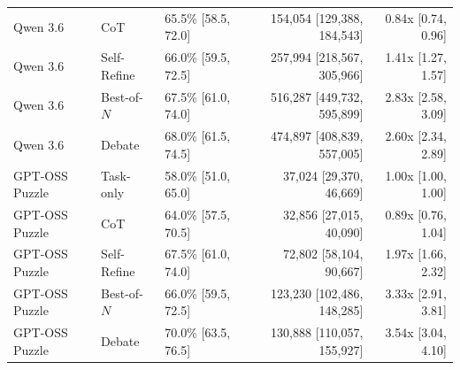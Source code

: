 \begin{table}[H]
{\begin{tabular}{@{}lllrr@{}}
Qwen 3.6 & CoT & 65.5\% [58.5, 72.0] & 154,054 [129,388, 184,543] & 0.84x [0.74, 0.96] \\
Qwen 3.6 & Self-Refine & 66.0\% [59.5, 72.5] & 257,994 [218,567, 305,966] & 1.41x [1.27, 1.57] \\
Qwen 3.6 & Best-of-$N$ & 67.5\% [61.0, 74.0] & 516,287 [449,732, 595,899] & 2.83x [2.58, 3.09] \\
Qwen 3.6 & Debate & 68.0\% [61.5, 74.5] & 474,897 [408,839, 557,005] & 2.60x [2.34, 2.89] \\
GPT-OSS Puzzle & Task-only & 58.0\% [51.0, 65.0] & 37,024 [29,370, 46,669] & 1.00x [1.00, 1.00] \\
GPT-OSS Puzzle & CoT & 64.0\% [57.5, 70.5] & 32,856 [27,015, 40,090] & 0.89x [0.76, 1.04] \\
GPT-OSS Puzzle & Self-Refine & 67.5\% [61.0, 74.0] & 72,802 [58,104, 90,667] & 1.97x [1.66, 2.32] \\
GPT-OSS Puzzle & Best-of-$N$ & 66.0\% [59.5, 72.5] & 123,230 [102,486, 148,285] & 3.33x [2.91, 3.81] \\
GPT-OSS Puzzle & Debate & 70.0\% [63.5, 76.5] & 130,888 [110,057, 155,927] & 3.54x [3.04, 4.10] \\
\bottomrule
\end{tabular}}
\end{table}

